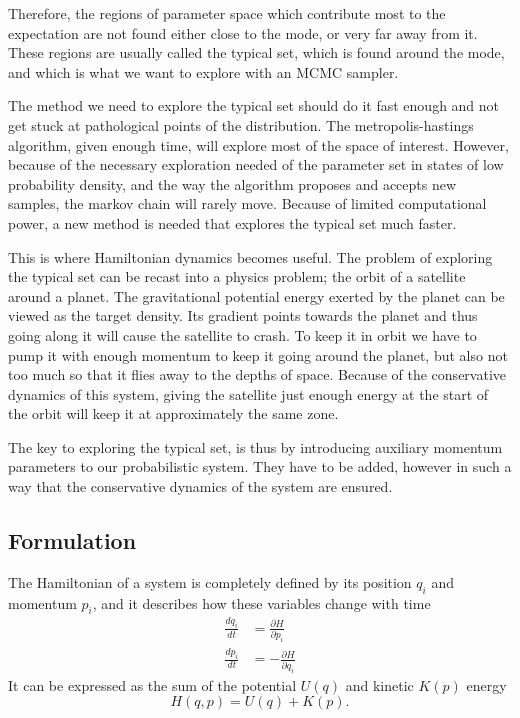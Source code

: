 Therefore, the regions of parameter space which contribute most to the expectation are not found either close to the mode, or very far away from it. These regions are usually called the typical set, which is found around the mode, and which is what we want to explore with an MCMC sampler. 


The method we need to explore the typical set should do it fast enough and not get stuck at pathological points of the distribution. The metropolis-hastings algorithm, given enough time, will explore most of the space of interest. However, because of the necessary exploration needed of the parameter set in states of low probability density, and the way the algorithm proposes and accepts new samples, the markov chain will rarely move. Because of limited computational power, a new method is needed that explores the typical set much faster.

This is where Hamiltonian dynamics becomes useful. The problem of exploring the typical set can be recast into a physics problem; the orbit of a satellite around a planet. The gravitational potential energy exerted by the planet can be viewed as the target density. Its gradient points towards the planet and thus going along it will cause the satellite to crash. To keep it in orbit we have to pump it with enough momentum to keep it going around the planet, but also not too much so that it flies away to the depths of space. Because of the conservative dynamics of this system, giving the satellite just enough energy at the start of the orbit will keep it at approximately the same zone.

The key to exploring the typical set, is thus by introducing auxiliary momentum parameters to our probabilistic system. They have to be added, however in such a way that the conservative dynamics of the system are ensured.

\subsection{Formulation}

The Hamiltonian of a system is completely defined by its position $q_i$ and momentum $p_i$, and it describes how these variables change with time 
\begin{align}
	\frac{dq_i}{dt} &= \frac{\partial H}{\partial p_i}\nonumber\\
		\frac{dp_i}{dt} &= -\frac{\partial H}{\partial q_i} \label{eq:motion}
\end{align}
It can be expressed as the sum of the potential $U(q)$ and kinetic $K(p)$ energy
\begin{equation}
	H(q,p) = U(q) + K(p).
\end{equation}

